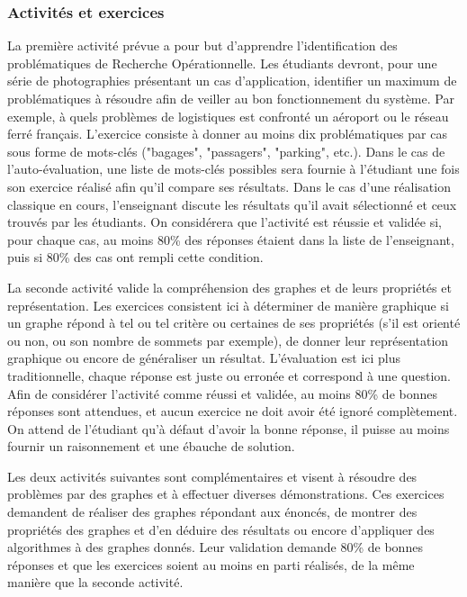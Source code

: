 \subsubsection{Activités et exercices}
La première activité prévue a pour but d'apprendre l'identification des problématiques de Recherche Opérationnelle. Les étudiants devront, pour une série de photographies présentant un cas d'application, identifier un maximum de problématiques à résoudre afin de veiller au bon fonctionnement du système. Par exemple, à quels problèmes de logistiques est confronté un aéroport ou le réseau ferré français. L'exercice consiste à donner au moins dix problématiques par cas sous forme de mots-clés ("bagages", "passagers", "parking", etc.). Dans le cas de l'auto-évaluation, une liste de mots-clés possibles sera fournie à l'étudiant une fois son exercice réalisé afin qu'il compare ses résultats. Dans le cas d'une réalisation classique en cours, l'enseignant discute les résultats qu'il avait sélectionné et ceux trouvés par les étudiants. On considérera que l'activité est réussie et validée si, pour chaque cas, au moins 80\% des réponses étaient dans la liste de l'enseignant, puis si 80\% des cas ont rempli cette condition. \par

La seconde activité valide la compréhension des graphes et de leurs propriétés et représentation. Les exercices consistent ici à déterminer de manière graphique si un graphe répond à tel ou tel critère ou certaines de ses propriétés (s'il est orienté ou non, ou son nombre de sommets par exemple), de donner leur représentation graphique ou encore de généraliser un résultat. L'évaluation est ici plus traditionnelle, chaque réponse est juste ou erronée et correspond à une question. Afin de considérer l'activité comme réussi et validée, au moins 80\% de bonnes réponses sont attendues, et aucun exercice ne doit avoir été ignoré complètement. On attend de l'étudiant qu'à défaut d'avoir la bonne réponse, il puisse au moins fournir un raisonnement et une ébauche de solution. \par

Les deux activités suivantes sont complémentaires et visent à résoudre des problèmes par des graphes et à effectuer diverses démonstrations. Ces exercices demandent de réaliser des graphes répondant aux énoncés, de montrer des propriétés des graphes et d'en déduire des résultats ou encore d'appliquer des algorithmes  à des graphes donnés. Leur validation demande 80\% de bonnes réponses et que les exercices soient au moins en parti réalisés, de la même manière que la seconde activité. \par

